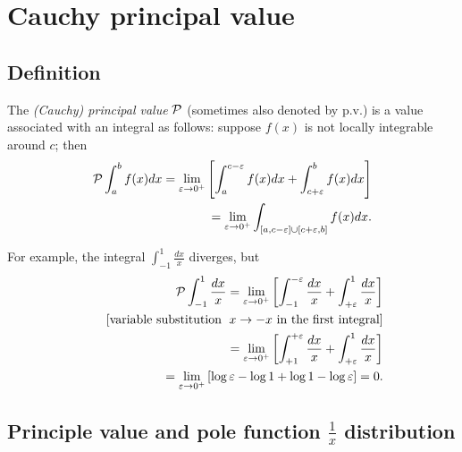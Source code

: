 
\section{Cauchy principal value}

\subsection{Definition}


The {\em  (Cauchy) principal value} ${\cal P}$ (sometimes also denoted by $\textrm{p.v.}$)
is a value associated with an integral as follows:
suppose $f(x)$ is not locally integrable around $c$; then
\begin{equation}
\begin{split}
{\cal P}
\int_{a}^b f(x) dx
= \lim_{\varepsilon \rightarrow 0^+}
\left[
\int_{a}^{c-\varepsilon} f(x) dx
+
\int_{c+\varepsilon}^{b} f(x) dx
\right]
\\
\qquad
=  \lim_{\varepsilon \rightarrow 0^+}
\int_{[a,c-\varepsilon] \cup [c+\varepsilon,b]}   f(x) dx
.
\end{split}
\end{equation}


{
\color{blue}
\bexample
For example, the integral
$ \int_{-1}^1 \frac{dx}{x}$ diverges, but
\begin{equation}
\begin{split}
{\cal P}
\int_{-1}^1 \frac{dx}{x}
= \lim_{\varepsilon \rightarrow 0^+}
\left[
\int_{-1}^{ -\varepsilon}\frac{dx}{x}
+
\int_{ +\varepsilon}^{1} \frac{dx}{x}
\right]
\\
\qquad
[\textrm{variable substitution }\; x\rightarrow -x \textrm{ in the first integral}]
\\
\qquad
=
\lim_{\varepsilon \rightarrow 0^+}
\left[
\int_{+1}^{ +\varepsilon}\frac{dx}{x}
+
\int_{ +\varepsilon}^{1} \frac{dx}{x}
\right]
\\
\qquad
=
\lim_{\varepsilon \rightarrow 0^+}
\left[
\log \varepsilon - \log 1  + \log 1  - \log \varepsilon
\right]
=0.
\end{split}
\end{equation}
\eexample
}

\subsection{Principle value and pole function $\frac{1}{x}$ distribution}

